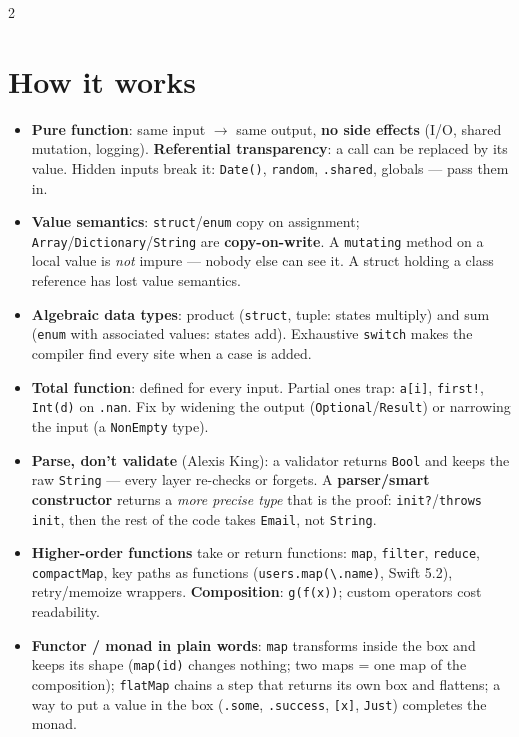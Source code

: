 \documentclass[8pt]{extarticle}
\begin{document}
\begin{multicols}{2}
\raggedright

\section{How it works}
\begin{itemize}
  \item \textbf{Pure function}: same input $\to$ same output, \textbf{no side effects}
        (I/O, shared mutation, logging). \textbf{Referential transparency}: a call can be
        replaced by its value. Hidden inputs break it: \texttt{Date()}, \texttt{random},
        \texttt{.shared}, globals — pass them in.
  \item \textbf{Value semantics}: \texttt{struct}/\texttt{enum} copy on assignment;
        \texttt{Array}/\texttt{Dictionary}/\texttt{String} are \textbf{copy-on-write}. A
        \texttt{mutating} method on a local value is \emph{not} impure — nobody else can see
        it. A struct holding a class reference has lost value semantics.
  \item \textbf{Algebraic data types}: product (\texttt{struct}, tuple: states multiply) and
        sum (\texttt{enum} with associated values: states add). Exhaustive \texttt{switch}
        makes the compiler find every site when a case is added.
  \item \textbf{Total function}: defined for every input. Partial ones trap:
        \texttt{a[i]}, \texttt{first!}, \texttt{Int(d)} on \texttt{.nan}. Fix by widening
        the output (\texttt{Optional}/\texttt{Result}) or narrowing the input (a
        \texttt{NonEmpty} type).
  \item \textbf{Parse, don't validate} (Alexis King): a validator returns
        \texttt{Bool} and keeps the raw \texttt{String} — every layer re-checks or forgets.
        A \textbf{parser/smart constructor} returns a \emph{more precise type} that is the
        proof: \texttt{init?}/\texttt{throws init}, then the rest of the code takes
        \texttt{Email}, not \texttt{String}.
  \item \textbf{Higher-order functions} take or return functions: \texttt{map},
        \texttt{filter}, \texttt{reduce}, \texttt{compactMap}, key paths as functions
        (\texttt{users.map(\textbackslash.name)}, Swift 5.2), retry/memoize wrappers.
        \textbf{Composition}: \texttt{g(f(x))}; custom operators cost readability.
  \item \textbf{Functor / monad in plain words}: \texttt{map} transforms inside the box
        and keeps its shape (\texttt{map(id)} changes nothing; two maps = one map of the
        composition); \texttt{flatMap} chains a step that returns its own box and
        flattens; a way to put a value in the box (\texttt{.some}, \texttt{.success},
        \texttt{[x]}, \texttt{Just}) completes the monad.
\end{itemize}


\end{multicols}
\end{document}
